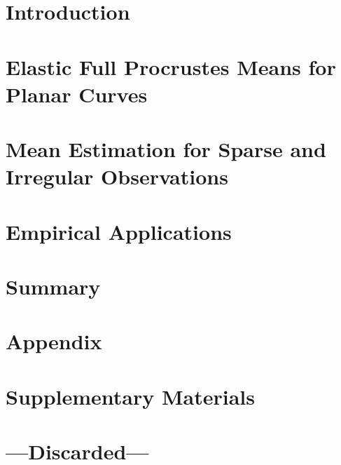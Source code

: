 \documentclass[a4paper,12pt,english,headings=small]{scrreprt}
\theoremstyle{plain}
\theoremstyle{definition}
\theoremstyle{remark}
\theoremstyle{plain}
\begin{document}
\listoftodos



\newpage
{}
\chapter{Introduction}


\newpage
\chapter{Elastic Full Procrustes Means for Planar Curves}


\newpage
\chapter{Mean Estimation for Sparse and Irregular Observations}


\newpage
\chapter{Empirical Applications}


\newpage
\chapter{Summary}




\newpage
\nocite{*}
\printbibliography[heading=bibintoc] %




\newpage
\appendix
\chapter{Appendix}


\newpage
\chapter{Supplementary Materials}


\newpage
\chapter*{---Discarded---}


\end{document}
